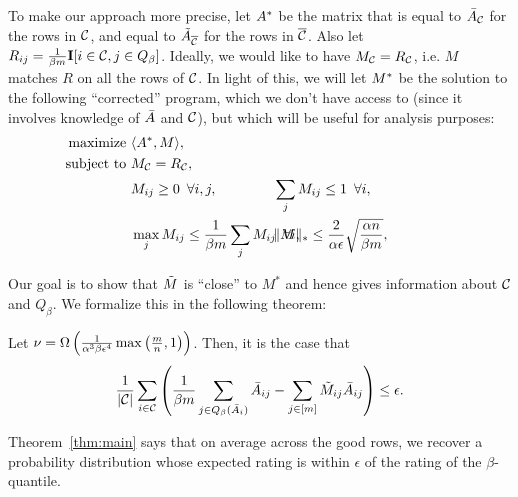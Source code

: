 To make our approach more precise, let $A^*$ be the matrix that is equal to 
$\bar{A}_{\mathcal{C}}$ for the rows in $\mathcal{C}$, 
and equal to $\tilde{A}_{\overline{\mathcal{C}}}$ for the rows in $\overline{\mathcal{C}}$. Also let 
$R_{ij} = \frac{1}{\beta m}\mathbf{I}[i \in \mathcal{C}, j \in Q_{\beta}]$. 
Ideally, we would like to have $M_{\mathcal{C}} = R_{\mathcal{C}}$, i.e. $M$ matches $R$ on 
all the rows of $\mathcal{C}$. In light of this, 
we will let $M^*$ be the solution to the following ``corrected'' program, which 
we don't have access to (since it involves knowledge of $\bar{A}$ and $\mathcal{C}$), 
but which will be useful for analysis purposes:
\begin{align}
\label{eq:optimization-noiseless}
\text{maximize } &\langle \Aa, M \rangle, \\
\notag \text{ subject to } &M_{\good} = R_{\good}, \\
\notag  &M_{ij} \geq 0 \,\,\, \forall i,j, 
  &&\hskip-0.4in\sum_j M_{ij} \leq 1 \,\,\, \forall i, \\
\notag  &\max_j M_{ij} \leq \frac{1}{\beta m}\sum_j M_{ij} \,\,\, \forall i, 
  &&\hskip-0.4in\|M\|_* \leq \frac{2}{\alpha\epsilon}\sqrt{\frac{\alpha n}{\beta m}}, \phantom{xxxxxxx}
\end{align}

Our goal is to show that $\tilde{M}$ is ``close'' to $M^*$ and hence gives information 
about $\mathcal{C}$ and $Q_{\beta}$. 
We formalize this in the following theorem:
\begin{theorem}
\label{thm:main}
Let $\nu = \Omega\left( \frac{1}{\alpha^3\beta\epsilon^4}\max\left( \frac{m}{n},1 \right) \right)$. Then, it is the case that 
\[ \frac{1}{|\mathcal{C}|} \sum_{i \in \mathcal{C}} \left( \frac{1}{\beta m} \sum_{j \in Q_{\beta}(\bar{A}_i)} \bar{A}_{ij} - \sum_{j \in [m]} \tilde{M}_{ij} \bar{A}_{ij} \right) \leq \epsilon. \]
\end{theorem}
Theorem~\ref{thm:main} says that on average across the good rows, we recover 
a probability distribution whose expected rating is within $\epsilon$ of 
the rating of the $\beta$-quantile. 

